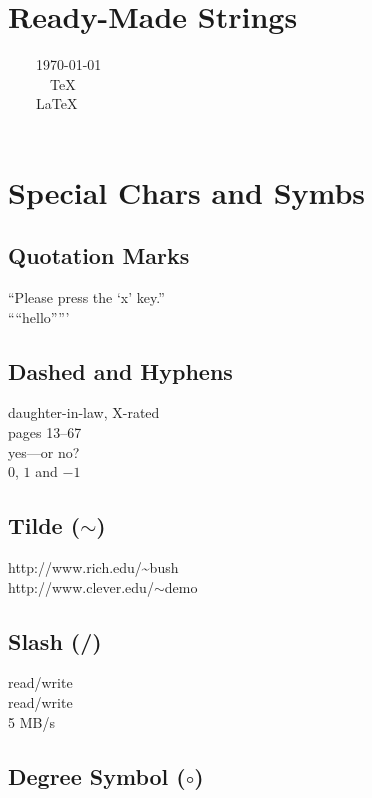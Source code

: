 \documentclass{article}
\begin{document}
\section*{Ready-Made Strings}

~~~~\today{}\\
~~~~~~\TeX{}\\
~~~~\LaTeX{}\\
~~~\LaTeXe{}

\section*{Special Chars and Symbs}

\subsection*{Quotation Marks}

``Please press the `x' key.''\\
````hello'''''

\subsection*{Dashed and Hyphens}

daughter-in-law, X-rated\\
pages 13--67\\
yes---or no? \\
$0$, $1$ and $-1$

\subsection*{Tilde ($\sim$)}

http://www.rich.edu/\~{}bush \\
http://www.clever.edu/$\sim$demo

\subsection*{Slash (\slash)}

read\slash write\\
read/write\\
5 MB/s

\subsection*{Degree Symbol ($\circ$)}
\end{document}
